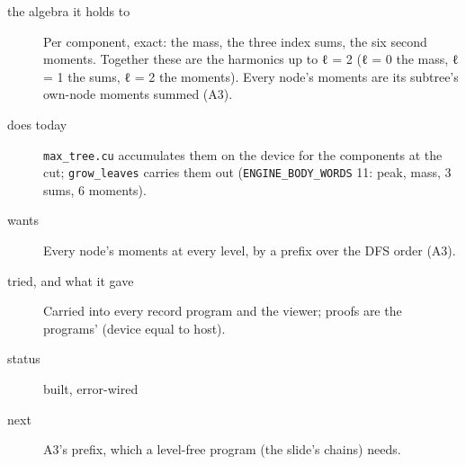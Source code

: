 \begin{description}
\item[{the algebra it holds to}] Per component, exact: the mass, the three index sums, the six second moments. Together these are the harmonics up to ℓ = 2 (ℓ = 0 the mass, ℓ = 1 the sums, ℓ = 2 the moments). Every node's moments are its subtree's own-node moments summed (A3).
\item[{does today}] \texttt{max\_\allowbreak{}tree.\allowbreak{}cu} accumulates them on the device for the components at the cut; \texttt{grow\_\allowbreak{}leaves} carries them out (\texttt{ENGINE\_\allowbreak{}BODY\_\allowbreak{}WORDS} 11: peak, mass, 3 sums, 6 moments).
\item[{wants}] Every node's moments at every level, by a prefix over the DFS order (A3).
\item[{tried, and what it gave}] Carried into every record program and the viewer; proofs are the programs' (device equal to host).
\item[{status}] built, error-wired
\item[{next}] A3's prefix, which a level-free program (the slide's chains) needs.
\end{description}

